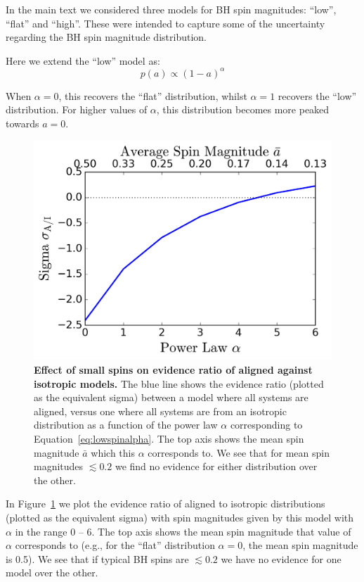 \documentclass[modern,linenumbers]{aastex61}
\begin{document}
In the main text we considered three models for BH spin magnitudes:
``low'', ``flat'' and ``high''. These were intended to capture some of
the uncertainty regarding the BH spin magnitude distribution.

Here we extend the ``low'' model as:
%
\begin{equation}
p(a) \propto (1 - a)^{\alpha}
\label{eq:lowspinalpha}
\end{equation}
%

When $\alpha = 0$, this recovers the ``flat'' distribution, whilst
$\alpha = 1$ recovers the ``low'' distribution. For higher values of
$\alpha$, this distribution becomes more peaked towards
$a = 0$.

%
\begin{figure}
\centering
\includegraphics[width=\textwidth]{../plots/sigma_v_alpha.png}
\caption{\textbf{Effect of small spins on evidence ratio of aligned
    against isotropic models.} The blue line shows the evidence ratio
  (plotted as the equivalent sigma) between a model where all systems
  are aligned, versus one where all systems are from an isotropic
  distribution as a function of the power law $\alpha$ corresponding
  to Equation~\ref{eq:lowspinalpha}.  The top axis shows the mean spin
  magnitude $\bar{a}$ which this $\alpha$ corresponds to. We see that
  for mean spin magnitudes $\lesssim 0.2$ we find no evidence for
  either distribution over the other.}
\label{fig:smallspinsalpha}
\end{figure}
%

In Figure~\ref{fig:smallspinsalpha} we plot the evidence ratio of
aligned to isotropic distributions (plotted as the equivalent sigma)
with spin magnitudes given by this model with $\alpha$ in the range
$0$ -- $6$. The top axis shows the mean spin magnitude that value of
$\alpha$ corresponds to (e.g., for the ``flat'' distribution
$\alpha = 0$, the mean spin magnitude is 0.5). We see that if typical
BH spins are $\lesssim 0.2$ we have no evidence for one model over the
other.
\end{document}
